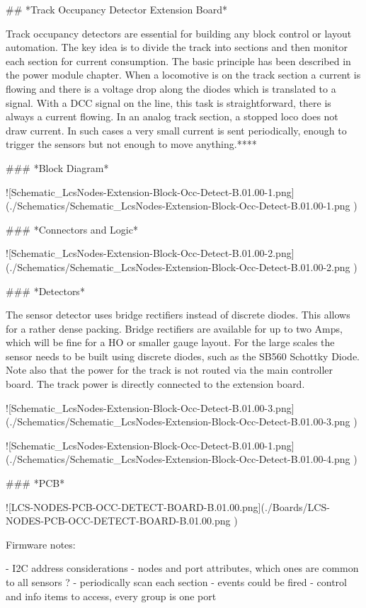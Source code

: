 ## *Track Occupancy Detector Extension Board*

Track occupancy detectors are essential for building any block control or layout automation. The key idea is to divide the track into sections and then monitor each section for current consumption. The basic principle has been described in the power module chapter. When a locomotive is on the track section a current is flowing and there is a voltage drop along the diodes which is translated to a signal. With a DCC signal on the line, this task is straightforward, there is always a current flowing. In an analog track section, a stopped loco does not draw current. In such cases a very small current is sent periodically, enough to trigger the sensors but not enough to move anything.****

### *Block Diagram*

![Schematic_LcsNodes-Extension-Block-Occ-Detect-B.01.00-1.png](./Schematics/Schematic_LcsNodes-Extension-Block-Occ-Detect-B.01.00-1.png )

### *Connectors and Logic*

![Schematic_LcsNodes-Extension-Block-Occ-Detect-B.01.00-2.png](./Schematics/Schematic_LcsNodes-Extension-Block-Occ-Detect-B.01.00-2.png )

### *Detectors*

The sensor detector uses bridge rectifiers instead of discrete diodes. This allows for a rather dense packing. Bridge rectifiers are available for up to two Amps, which will be fine for a HO or smaller gauge layout. For the large scales the sensor needs to be built using discrete diodes, such as the SB560 Schottky Diode. Note also that the power for the track is not routed via the main controller board. The track power is directly connected to the extension board.

![Schematic_LcsNodes-Extension-Block-Occ-Detect-B.01.00-3.png](./Schematics/Schematic_LcsNodes-Extension-Block-Occ-Detect-B.01.00-3.png )

![Schematic_LcsNodes-Extension-Block-Occ-Detect-B.01.00-1.png](./Schematics/Schematic_LcsNodes-Extension-Block-Occ-Detect-B.01.00-4.png )

### *PCB*

![LCS-NODES-PCB-OCC-DETECT-BOARD-B.01.00.png](./Boards/LCS-NODES-PCB-OCC-DETECT-BOARD-B.01.00.png )


Firmware notes:

- I2C address considerations
- nodes and port attributes, which ones are common to all sensors ?
- periodically scan each section
- events could be fired
- control and info items to access, every group is one port

